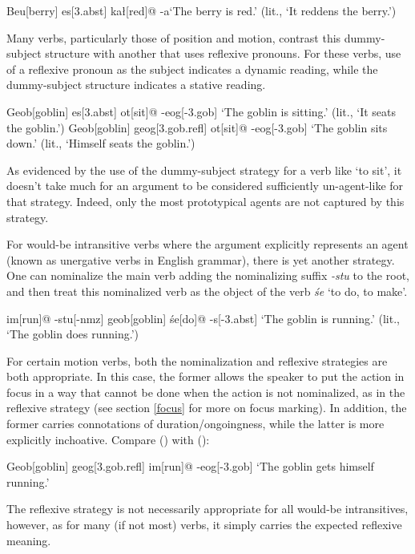 \documentclass[a4paper,11pt,oneside,openany]{memoir}
\begin{document}
\ex
\begingl
Beu[berry]
es[\sc 3.abst]
ka\l[red]@
-a\vn[\sc -3.quas]
\glft `The berry is red.' (lit., `It reddens the berry.')
\endgl
\xe

Many verbs, particularly those of position and motion, contrast this dummy-subject structure with another that uses reflexive pronouns. For these verbs, use of a reflexive pronoun as the subject indicates a dynamic reading, while the dummy-subject structure indicates a stative reading.

\pex
\a
\begingl
Geob[goblin]
es[\sc 3.abst]
ot[sit]@
-eog[\sc -3.gob]
\glft `The goblin is sitting.' (lit., `It seats the goblin.')
\endgl
\a
\begingl
Geob[goblin]
geog[\sc 3.gob.refl]
ot[sit]@
-eog[\sc -3.gob]
\glft `The goblin sits down.' (lit., `Himself seats the goblin.')
\endgl
\xe

As evidenced by the use of the dummy-subject strategy for a verb like `to sit', it doesn't take much for an argument to be considered sufficiently un-agent-like for that strategy. Indeed, only the most prototypical agents are not captured by this strategy.

For would-be intransitive verbs where the argument explicitly represents an agent (known as unergative verbs in English grammar), there is yet another strategy. One can nominalize the main verb adding the nominalizing suffix \textit{-stu} to the root, and then treat this nominalized verb as the object of the verb \textit{\'se} `to do, to make'.

\ex
\begingl
\vR im[run]@
-stu[\sc -nmz]
geob[goblin]
\'se[do]@
-s[\sc -3.abst]
\glft  `The goblin is running.' (lit., `The goblin does running.')
\endgl
\xe

For certain motion verbs, both the nominalization and reflexive strategies are both appropriate. In this case, the former allows the speaker to put the action in focus in a way that cannot be done when the action is not nominalized, as in the reflexive strategy (see section \ref{focus} for more on focus marking). In addition, the former carries connotations of duration/ongoingness, while the latter is more explicitly inchoative. Compare (\lastx) with (\nextx):

\ex
\begingl
Geob[goblin]
geog[\sc 3.gob.refl]
\vr im[run]@
-eog[\sc -3.gob]
\glft `The goblin gets himself running.'
\endgl
\xe

The reflexive strategy is not necessarily appropriate for all would-be intransitives, however, as for many (if not most) verbs, it simply carries the expected reflexive meaning.
\end{document}
